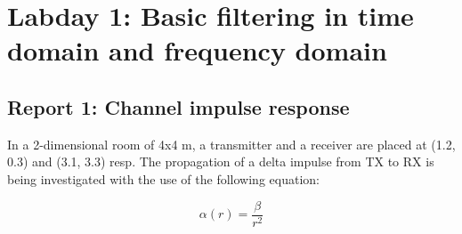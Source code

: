 \documentclass[final]{scrreprt} %
\begin{document}
\section{Labday 1: Basic filtering in time domain and frequency domain}
\subsection{Report 1: Channel impulse response}
In a 2-dimensional room of 4x4 m, a transmitter and a receiver are placed at (1.2, 0.3) and (3.1, 3.3) resp.
The propagation of a delta impulse from TX to RX is being investigated with the use of the following equation:

\begin{equation}
	\alpha (r) = \frac{\beta}{r^2}
\label{eq:damping}
\end{equation}
\end{document}
